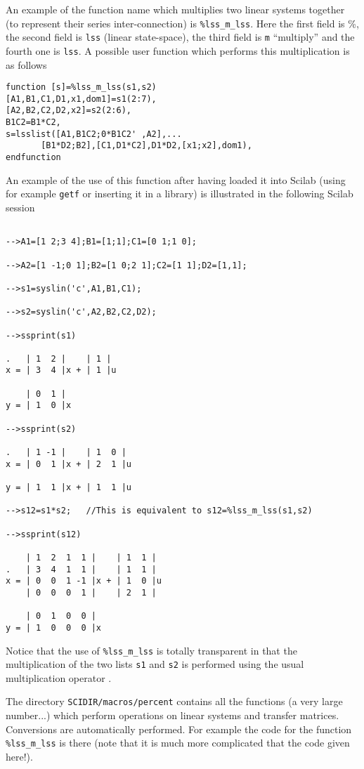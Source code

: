 	An example of the function name which multiplies two
linear systems together (to represent their series inter-connection)
is {\tt \%lss\_m\_lss}.  Here the first field is \%, the second field is 
{\tt lss} (linear state-space), the third field is {\tt m} ``multiply''
and the fourth one is {\tt lss}. A possible user function which performs
this multiplication is as follows
\begin{verbatim}
function [s]=%lss_m_lss(s1,s2)
[A1,B1,C1,D1,x1,dom1]=s1(2:7),
[A2,B2,C2,D2,x2]=s2(2:6),
B1C2=B1*C2,
s=lsslist([A1,B1C2;0*B1C2' ,A2],...
       [B1*D2;B2],[C1,D1*C2],D1*D2,[x1;x2],dom1),
endfunction
\end{verbatim}
An example of the use of this function after having loaded it into
Scilab (using for example {\tt getf} or inserting it in a library) 
is illustrated in the following Scilab session
\begin{verbatim}
 
-->A1=[1 2;3 4];B1=[1;1];C1=[0 1;1 0];
 
-->A2=[1 -1;0 1];B2=[1 0;2 1];C2=[1 1];D2=[1,1];
 
-->s1=syslin('c',A1,B1,C1);
 
-->s2=syslin('c',A2,B2,C2,D2);
 
-->ssprint(s1)
 
.   | 1  2 |    | 1 |    
x = | 3  4 |x + | 1 |u   
 
    | 0  1 |    
y = | 1  0 |x   
 
-->ssprint(s2)
 
.   | 1 -1 |    | 1  0 |    
x = | 0  1 |x + | 2  1 |u   
 
y = | 1  1 |x + | 1  1 |u   
 
-->s12=s1*s2;   //This is equivalent to s12=%lss_m_lss(s1,s2)
 
-->ssprint(s12)
 
    | 1  2  1  1 |    | 1  1 |    
.   | 3  4  1  1 |    | 1  1 |    
x = | 0  0  1 -1 |x + | 1  0 |u   
    | 0  0  0  1 |    | 2  1 |    
 
    | 0  1  0  0 |    
y = | 1  0  0  0 |x   
\end{verbatim}
Notice that the use of {\tt \%lss\_m\_lss} is totally transparent in
that the multiplication of the two lists {\tt s1} and {\tt s2}
is performed using the usual multiplication operator {\tt *}.

The directory {\tt SCIDIR/macros/percent} contains all the functions
(a very large number...) which perform operations on linear systems
and transfer matrices. Conversions are automatically performed.
For example the code for the function {\tt \%lss\_m\_lss} is there (note
that it is much more complicated that the code given here!).
